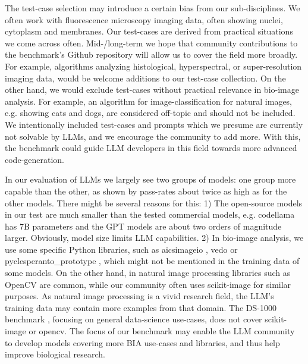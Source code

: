 \documentclass{ecai}
\begin{document}
The test-case selection may introduce a certain bias from our sub-disciplines. We often work with fluorescence microscopy imaging data, often showing nuclei, cytoplasm and membranes. Our test-cases are derived from practical situations we come across often. Mid-/long-term we hope that community contributions to the benchmark's Github repository will allow us to cover the field more broadly. For example, algorithms analyzing histological, hyperspectral, or super-resolution imaging data, would be welcome additions to our test-case collection. On the other hand, we would exclude test-cases without practical relevance in bio-image analysis. For example, an algorithm for image-classification for natural images, e.g. showing cats and dogs, are considered off-topic and should not be included. We intentionally included test-cases and prompts which we presume are currently not solvable by LLMs, and we encourage the community to add more. With this, the benchmark could guide LLM developers in this field towards more advanced code-generation.

In our evaluation of LLMs we largely see two groups of models: one group more capable than the other, as shown by pass-rates about twice as high as for the other models. There might be several reasons for this: 1) The open-source models in our test are much smaller than the tested commercial models, e.g. codellama has 7B parameters and the GPT models are about two orders of magnitude larger. Obviously, model size limits LLM capabilities. 2) In bio-image analysis, we use some specific Python libraries, such as aicsimageio \citep{aicsimageio}, vedo \citep{musy2024} or pyclesperanto\_prototype \citep{robert_haase_2023_10432619}, which might not be mentioned in the training data of some models. On the other hand, in natural image processing libraries such as OpenCV \citep{itseez2015opencv} are common, while our community often uses scikit-image \citep{scikit-image} for similar purposes. As natural image processing is a vivid research field, the LLM’s training data may contain more examples from that domain. The DS-1000 benchmark \citep{lai2022ds1000}, focusing on general data-science use-cases, does not cover scikit-image or opencv. The focus of our benchmark may enable the LLM community to develop models covering more BIA use-cases and libraries, and thus help improve biological research.
\end{document}
